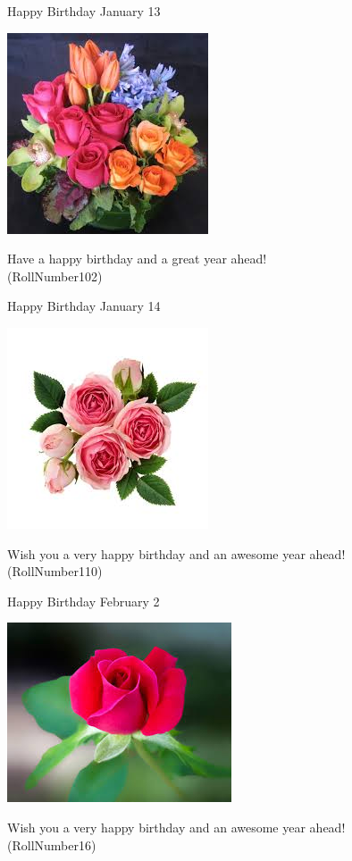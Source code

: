 \documentclass[table, landscape]{beamer}
\begin{document}
\begin{frame}{\color{red}Happy Birthday }
{January 13}
\begin{center}
\includegraphics[height=0.5\textheight]{flowers/f9.jpeg}

Have a happy birthday and a great year ahead! \\ \vspace{0.5cm}{\Large name95} (RollNumber102)
\end{center}
\end{frame}
\begin{frame}{\color{blue}Happy Birthday }
{January 14}
\begin{center}
\includegraphics[height=0.5\textheight]{flowers/f5.jpeg}

Wish you a very happy birthday and an awesome year ahead! \\ \vspace{0.5cm}{\Large name103} (RollNumber110)
\end{center}
\end{frame}
\begin{frame}{\color{red}Happy Birthday }
{February 2}
\begin{center}
\includegraphics[height=0.5\textheight]{flowers/f3.jpeg}

Wish you a very happy birthday and an awesome year ahead! \\ \vspace{0.5cm}{\Large name11} (RollNumber16)
\end{center}
\end{frame}
\end{document}
